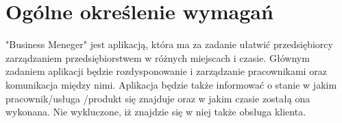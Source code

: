 	\newpage
\section{Ogólne określenie wymagań}		%













\hspace{0.60cm}"Business Meneger" jest aplikacją, która ma za zadanie ułatwić przedsiębiorcy zarządzaniem przedsiębiorstwem w różnych miejscach i czasie. Głównym zadaniem aplikacji będzie rozdysponowanie i zarządzanie pracownikami oraz komunikacja między nimi. Aplikacja będzie także informować o stanie w jakim pracownik/usługa /produkt się znajduje oraz w jakim czasie zostałą ona wykonana. Nie wykluczone, iż znajdzie się w niej także obsługa klienta.

